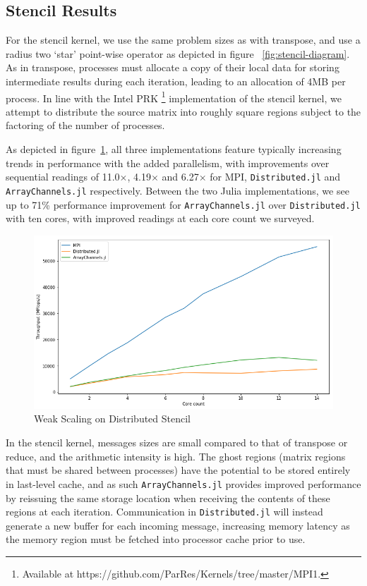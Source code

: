 \subsection{Stencil Results}
\label{sec:stencil}

For the stencil kernel, we use the same problem sizes as with transpose,
and use a radius two `star' point-wise operator as depicted in figure
~\ref{fig:stencil-diagram}. As in transpose, processes must allocate a
copy of their local data for storing intermediate results during each
iteration, leading to an allocation of 4MB per process. In line with the
Intel PRK \footnote{Available at
  https://github.com/ParRes/Kernels/tree/master/MPI1.} implementation of
the stencil kernel, we attempt to distribute the source matrix into
roughly square regions subject to the factoring of the number of
processes.

As depicted in figure~\ref{fig:plot-stencil}, all three implementations feature typically increasing trends in
performance with the added parallelism, with improvements over
sequential readings of 11.0\(\times\), 4.19\(\times\) and 6.27\(\times\)
for MPI, \texttt{Distributed.jl} and \texttt{ArrayChannels.jl}
respectively. Between the two Julia implementations, we see up to 71\%
performance improvement for \texttt{ArrayChannels.jl} over
\texttt{Distributed.jl} with ten cores, with improved readings at each
core count we surveyed.

\begin{figure}[htb]
  \includegraphics[width=\linewidth]{figs/stencil.png}
  \caption{Weak Scaling on Distributed Stencil}
  \label{fig:plot-stencil}
\end{figure}

In the stencil kernel, messages sizes are small compared to that of
transpose or reduce, and the arithmetic intensity is high. The ghost
regions (matrix regions that must be shared between processes) have the
potential to be stored entirely in last-level cache, and as such
\texttt{ArrayChannels.jl} provides improved performance by reissuing the
same storage location when receiving the contents of these regions at
each iteration. Communication in \texttt{Distributed.jl} will instead
generate a new buffer for each incoming message, increasing memory
latency as the memory region must be fetched into processor cache prior
to use.
